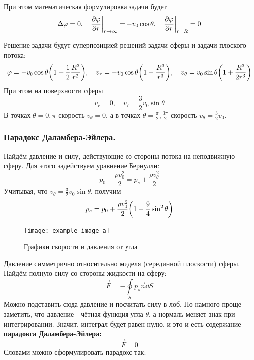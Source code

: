 При этом математическая формулировка задачи будет
\begin{equation}
    \Delta \varphi = 0, \quad
    \pdv{\varphi}{r}\bigg|_{r\to \infty} = -v_0 \cos\theta, \quad
    \pdv{\varphi}{r}\bigg|_{r=R} = 0
\end{equation}

Решение задачи будут суперпозицией решений задачи сферы и задачи плоского потока:
\begin{equation}
    \varphi = -v_0 \cos\theta \qty(1+\frac{1}{2}\frac{R^3}{r^2}), \quad
    v_r = -v_0\cos\theta \qty(1-\frac{R^3}{r^3}), \quad
    v_\theta = v_0\sin\theta \qty(1+\frac{R^3}{2r^3})
\end{equation}
При этом на поверхности сферы
\begin{equation}
    v_r = 0, \quad
    v_\theta = \frac{3}{2}v_0\sin\theta
\end{equation}
В точках $\theta=0,\pi$ скорость $v_\theta=0$, а в точках $\theta=\frac{\pi}{2}, \frac{3\pi}{2}$ скорость $v_\theta=\frac{3}{2}v_0$.

\subsubsection{Парадокс Даламбера-Эйлера.} Найдём давление и силу, 
действующие со стороны потока на неподвижную сферу. Для этого задействуем
 уравнение Бернулли:
\begin{equation}
    p_0 + \frac{\rho v_0^2}{2} = 
    p_s + \frac{\rho v_\theta^2}{2}
\end{equation}
Учитывая, что $v_\theta=\frac{3}{2}v_0\sin\theta$, получим
\begin{equation}
    p_s = p_0 + \frac{\rho v_0^2}{2}\qty(1-\frac{9}{4}\sin^2\theta)
\end{equation}
\begin{figure}[H]
    \centering
    \texttt{[image: example-image-a]}
    \caption{Графики скорости и давления от угла}
    \label{fig:pandv}
\end{figure}
Давление симметрично относительно миделя (серединной плоскости) сферы. Найдём полную силу со стороны жидкости на сферу:
\begin{equation}
    \vec{F} = - \oint\limits_S p_s \vec{n} \dd{S}
\end{equation}
Можно подставить сюда давление и посчитать силу в лоб. Но намного проще
 заметить, что давление - чётная функция угла $\theta$, а нормаль 
 меняет знак при интегрировании. Значит, интеграл будет равен нулю, и
 это и есть содержание \textbf{парадокса Даламбера-Эйлера:}
 \begin{equation}
     \vec{F}=0
 \end{equation}
Словами можно сформулировать парадокс так:

